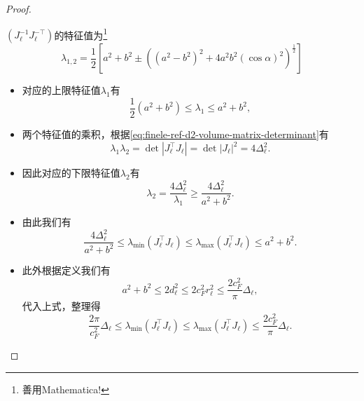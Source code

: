 \begin{proof}
\begin{enumerate}
$\left(J_{\ell}^{-1} J_{\ell}^{-\top} \right)$的特征值为\footnote{善用Mathematica!}
\begin{equation*}
  \lambda_{1,2} = \frac{1}{2}
  \left[
  a^{2} + b^{2} \pm
  \left(
  \left(a^{2} - b^{2} \right)^2
  + 4 a^{2} b^{2} \left( \cos \alpha \right)^{2}
  \right)^{\frac{1}{2}}
  \right]
\end{equation*}
\begin{itemize}
  \item 对应的上限特征值$\lambda_{1}$有
  \begin{equation*}
    \frac{1}{2} \left( a^{2} + b^{2} \right) \le \lambda_{1} \le a^{2} + b^{2},
  \end{equation*}
  \item 两个特征值的乘积，根据\eqref{eq:finele-ref-d2-volume-matrix-determinant}有
  \begin{equation*}
    \lambda_{1} \lambda_{2} = \det \left| J_{\ell}^{\top} J_{\ell} \right|
    = \det \left| J_{\ell} \right|^{2}
    = 4 \Delta_{\ell}^{2}.
  \end{equation*}
  \item 因此对应的下限特征值$\lambda_{2}$有
  \begin{equation*}
    \lambda_{2} = \frac{4 \Delta_{\ell}^{2}}{\lambda_{1}} \ge \frac{4 \Delta_{\ell}^{2}}{a^{2} + b^{2}}.
  \end{equation*}
  \item 由此我们有
  \begin{equation*}
    \frac{4 \Delta_{\ell}^{2}}{a^{2} + b^{2}}
    \le \lambda_{\min}\left( J_{\ell}^{\top} J_{\ell} \right)
    \le \lambda_{\max}\left( J_{\ell}^{\top} J_{\ell} \right)
    \le a^{2} + b^{2}.
  \end{equation*}
  \item 此外根据定义我们有
  \begin{equation*}
    a^{2} + b^{2} \le 2 d_{\ell}^{2} \le 2 c_{F}^{2} r_{\ell}^{2}
    \le \frac{2 c_{F}^{2}}{\pi} \Delta_{\ell},
  \end{equation*}
  代入上式，整理得
  \begin{equation*}
    \frac{2 \pi}{c_{F}^{2}} \Delta_{\ell}
    \le \lambda_{\min} \left( J_{\ell}^{\top} J_{\ell} \right)
    \le \lambda_{\max}\left( J_{\ell}^{\top} J_{\ell} \right)
    \le \frac{2 c_{F}^{2}}{\pi} \Delta_{\ell}.
  \end{equation*}
\end{itemize}


\end{enumerate}
\end{proof}
